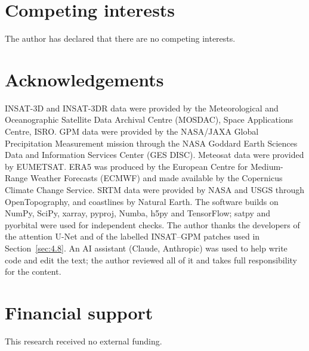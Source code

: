 \documentclass[11pt,a4paper]{article}
\begin{document}
\section*{Competing interests}
The author has declared that there are no competing interests.

\section*{Acknowledgements}
{\sloppy
INSAT-3D and INSAT-3DR data were provided by the Meteorological and Oceanographic Satellite Data Archival Centre (MOSDAC), Space Applications Centre, ISRO. GPM data were provided by the NASA/JAXA Global Precipitation Measurement mission through the NASA Goddard Earth Sciences Data and Information Services Center (GES DISC). Meteosat data were provided by EUMETSAT. ERA5 was produced by the European Centre for Medium-Range Weather Forecasts (ECMWF) and made available by the Copernicus Climate Change Service. SRTM data were provided by NASA and USGS through OpenTopography, and coastlines by Natural Earth. The software builds on NumPy, SciPy, xarray, pyproj, Numba, h5py and TensorFlow; satpy and pyorbital were used for independent checks. The author thanks the developers of the attention U-Net and of the labelled INSAT--GPM patches used in Section~\ref{sec:4.8}. An AI assistant (Claude, Anthropic) was used to help write code and edit the text; the author reviewed all of it and takes full responsibility for the content.\par}

\section*{Financial support}
This research received no external funding.



\end{document}
